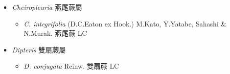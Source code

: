 
  \begin{itemize}
 \item[] \textit{Cheiropleuria} 燕尾蕨屬
                                
  \begin{itemize}
        \item[] \textit{C. integrifolia} (D.C.Eaton ex Hook.) M.Kato, Y.Yatabe, Sahashi \& N.Murak.  燕尾蕨   LC
  \end{itemize}
 \item[] \textit{Dipteris} 雙扇蕨屬
                                
  \begin{itemize}
        \item[] \textit{D. conjugata} Reinw.  雙扇蕨   LC
  \end{itemize}
  \end{itemize}
